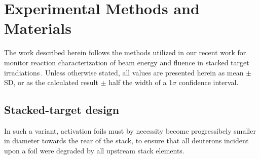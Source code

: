 


\section{\label{sec:experimental_U5_d}Experimental Methods and Materials}


The work described herein follows the  methods utilized in our recent work 
for monitor reaction characterization of beam energy and fluence in stacked target irradiations\,\cite{Voyles2018a,Morrell2019}.
Unless otherwise stated, all values are presented herein as mean $\pm$ SD, or as the calculated result $\pm$ half the width of a 1$\sigma$ confidence interval.



\subsection{\label{sec:target_design_U5_d}Stacked-target design}



In such a variant, activation foils must by necessity become progressibely smaller in diameter towards the rear of the stack, to ensure that all deuterons incident upon a foil were degraded by all upstream stack elements.

